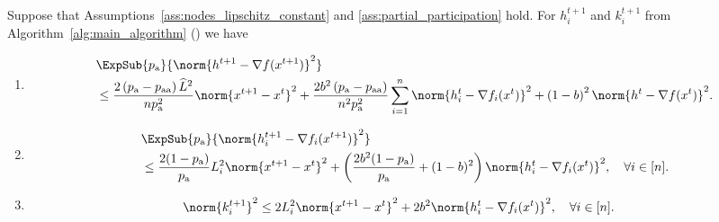 \documentclass{article}
\newcommand{\algorithmname}{DASHA-PP}
\newcommand*{\probavailable}{\ensuremath{p_{\textnormal{a}}}}
\newcommand*{\probpairaa}{\ensuremath{p_{\textnormal{aa}}}}
\begin{document}
\begin{lemma}
  \label{lemma:gradient}
  Suppose that Assumptions~\ref{ass:nodes_lipschitz_constant} and \ref{ass:partial_participation} hold. For $h^{t+1}_i$ and $k^{t+1}_i$ from Algorithm~\ref{alg:main_algorithm} (\algname{\algorithmname}) we have
  \begin{enumerate}
  \item
      \begin{align*}
          &\ExpSub{\probavailable}{\norm{h^{t+1} - \nabla f(x^{t+1})}^2} \\
          & \leq \frac{2\left(\probavailable - \probpairaa\right)\widehat{L}^2}{n \probavailable^2} \norm{x^{t+1} - x^{t}}^2 + \frac{2 b^2 \left(\probavailable - \probpairaa\right)}{n^2 \probavailable^2} \sum_{i=1}^n \norm{h^t_i - \nabla f_i(x^{t})}^2 + \left(1 - b\right)^2 \norm{h^{t} - \nabla f(x^{t})}^2.
      \end{align*}
  \item
      \begin{align*}
          &\ExpSub{\probavailable}{\norm{h^{t+1}_i - \nabla f_i(x^{t+1})}^2} \\
          & \leq \frac{2(1 - \probavailable)}{\probavailable} L^2_i \norm{x^{t+1} - x^{t}}^2 + \left(\frac{2 b^2 (1 - \probavailable)}{\probavailable} + (1 - b)^2\right) \norm{h^{t}_i - \nabla f_i(x^{t})}^2, \quad \forall i \in [n].
      \end{align*}
  \item
      \begin{align*}
        &\norm{k^{t+1}_i}^2 \leq 2L^2_i\norm{x^{t+1} - x^{t}}^2 + 2b^2 \norm{h^t_i - \nabla f_i(x^{t})}^2, \quad \forall i \in [n].
      \end{align*}
  \end{enumerate}
\end{lemma}
\end{document}
